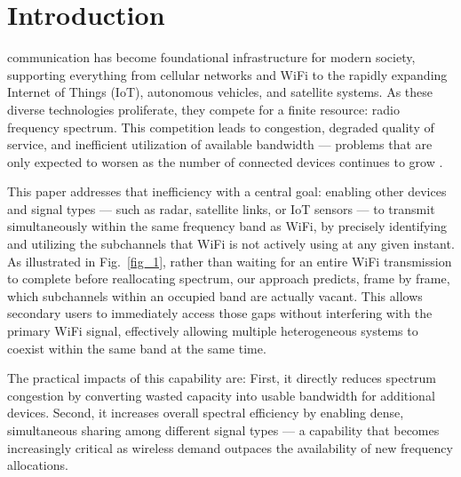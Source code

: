 \documentclass[lettersize,journal]{IEEEtran}
\begin{document}
\section{Introduction}
 communication has become foundational infrastructure for modern society, supporting everything from cellular networks and WiFi to the rapidly expanding Internet of Things (IoT), autonomous vehicles, and satellite systems. As these diverse technologies proliferate, they compete for a finite resource: radio frequency spectrum. This competition leads to congestion, degraded quality of service, and inefficient utilization of available bandwidth — problems that are only expected to worsen as the number of connected devices continues to grow \cite{intro_ref1, intro_ref2, intro_ref3, intro_ref4}.


This paper addresses that inefficiency with a central goal: enabling other devices and signal types — such as radar, satellite links, or IoT sensors — to transmit simultaneously within the same frequency band as WiFi, by precisely identifying and utilizing the subchannels that WiFi is not actively using at any given instant. As illustrated in Fig.~\ref{fig_1}, rather than waiting for an entire WiFi transmission to complete before reallocating spectrum, our approach predicts, frame by frame, which subchannels within an occupied band are actually vacant. This allows secondary users to immediately access those gaps without interfering with the primary WiFi signal, effectively allowing multiple heterogeneous systems to coexist within the same band at the same time.

The practical impacts of this capability are: First, it directly reduces spectrum congestion by converting wasted capacity into usable bandwidth for additional devices. Second, it increases overall spectral efficiency by enabling dense, simultaneous sharing among different signal types — a capability that becomes increasingly critical as wireless demand outpaces the availability of new frequency allocations.
\end{document}
